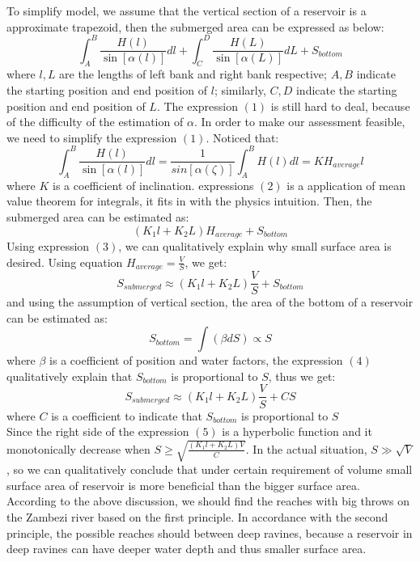 \documentclass{mcmthesis}
\begin{document}
\indent To simplify model, we assume that the vertical section of a reservoir is a approximate trapezoid, then the submerged area can be expressed as below:
\begin{equation}\int_{A}^{B}\frac{H\left(l\right)}{\sin\left[\alpha\left(l\right)\right]}dl + \int_{C}^{D}\frac{H\left(L\right)}{\sin\left[\alpha\left(L\right)\right]}dL + S_{bottom}\end{equation}
where $l, L$ are the lengths of left bank and right bank respective; $A, B$ indicate the starting position and end position of $l$; similarly, $C, D$ indicate the starting position and end position of $L$.
The expression $\left(1\right)$ is still hard to deal, because of the difficulty of the estimation of $\alpha$. In order to make our assessment feasible, we need to simplify the expression $\left(1\right)$. Noticed that:
\begin{equation}
\int_{A}^{B}\frac{H\left(l\right)}{\sin\left[\alpha\left(l\right)\right]}dl = \frac{1}{sin\left[\alpha\left(\zeta\right)\right]}\int_{A}^{B}H\left(l\right)dl
= KH_{average}l
\end{equation}
where $K$ is a coefficient of inclination. expressions $\left(2\right)$ is a application of mean value theorem for integrals, it fits in with the physics intuition. Then, the submerged area can be estimated as:
\begin{equation}
\left(K_{1}l + K_{2}L\right)H_{average} + S_{bottom}
\end{equation}
Using expression $\left(3\right)$, we can qualitatively explain why small surface area is desired. Using equation $H_{average} = \frac{V}{S}$, we get:
\[S_{submerged} \approx \left(K_{1}l + K_{2}L\right)\frac{V}{S} + S_{bottom}\]
and using the assumption of vertical section, the area of the bottom of a reservoir can be estimated as:
\begin{equation}
S_{bottom} = \int\left(\beta dS \right) \propto S
\end{equation}  
where $\beta$ is a coefficient of position and water factors, the expression $\left(4\right)$ qualitatively explain that $S_{bottom}$ is proportional to $S$, thus we get:
\begin{equation}
S_{submerged} \approx \left(K_{1}l + K_{2}L\right)\frac{V}{S} + CS
\end{equation}
where $C$ is a coefficient to indicate that $S_{bottom}$ is proportional to $S$\\
Since the right side of the expression $\left(5\right)$ is a hyperbolic function and it monotonically decrease when $S \geq \sqrt{\frac{\left(K_{1}l + K_{2}L\right)V}{C}}$. In the actual situation, $S \gg \sqrt{V}$, so we can qualitatively conclude that under certain requirement of volume small surface area of reservoir is more beneficial than the bigger surface area.\\
\indent According to the above discussion, we should find the reaches with big throws on the Zambezi river based on the first principle. In accordance with the second principle, the possible reaches should between deep ravines, because a reservoir in deep ravines can have deeper water depth and thus smaller surface area.
\end{document}
